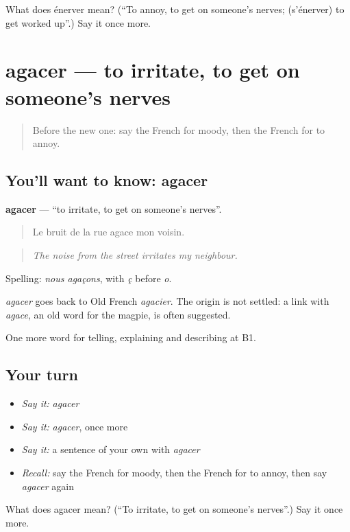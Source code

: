 \begin{tcolorbox}[breakable,colback=teal!4,colframe=teal!35!black,title={Before you move on}]
What does énerver mean? (\textquotedblleft{}To annoy, to get on someone's nerves; (s'énerver) to get worked up\textquotedblright{}.) Say it once more.
\end{tcolorbox}
\section[agacer]{agacer — to irritate, to get on someone's nerves}

\label{lesson:FR-C469-agacer}



\begin{quote}
Before the new one: say the French for moody, then the French for to annoy.
\end{quote}

\subsection*{You'll want to know: agacer}
\textbf{agacer} — \textquotedblleft{}to irritate, to get on someone's nerves\textquotedblright{}.

\begin{quote}
Le bruit de la rue agace mon voisin.
\end{quote}

\begin{quote}
\emph{The noise from the street irritates my neighbour.}
\end{quote}

Spelling: \emph{nous agaçons}, with \emph{ç} before \emph{o}.

\begin{cousinweb}
\emph{agacer} goes back to Old French \emph{agacier}. The origin is not settled: a link with \emph{agace}, an old word for the magpie, is often suggested.
\end{cousinweb}

\begin{grammarlens}[title={What you've built}]
One more word for telling, explaining and describing at B1.
\end{grammarlens}

\subsection*{Your turn}
\begin{itemize}
\raggedright
  \item \emph{Say it:} \emph{agacer}
  \item \emph{Say it:} \emph{agacer}, once more
  \item \emph{Say it:} a sentence of your own with \emph{agacer}
  \item \emph{Recall:} say the French for moody, then the French for to annoy, then say \emph{agacer} again
\end{itemize}

\begin{tcolorbox}[breakable,colback=teal!4,colframe=teal!35!black,title={Before you move on}]
What does agacer mean? (\textquotedblleft{}To irritate, to get on someone's nerves\textquotedblright{}.) Say it once more.
\end{tcolorbox}
